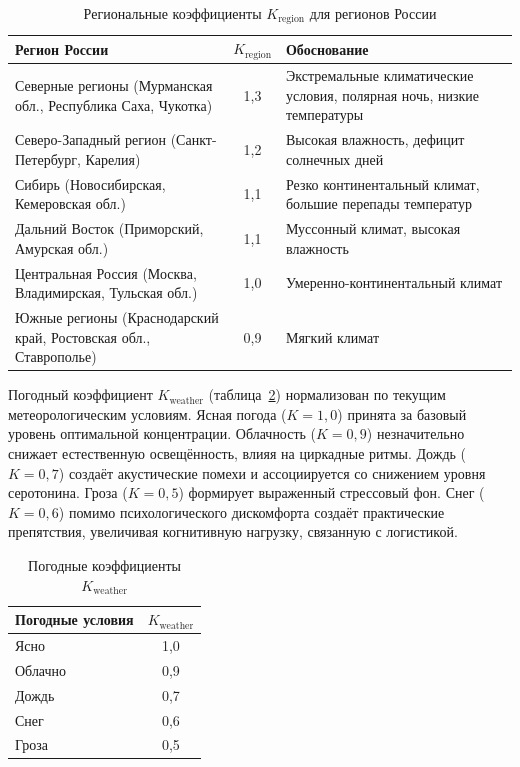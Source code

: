 \begin{table}[htbp]
\centering
\caption{Региональные коэффициенты $K_{\text{region}}$ для регионов России}
\label{tab:region}
\begin{tabular}{|p{6cm}|c|p{6cm}|}
\hline
\textbf{Регион России} & \textbf{$K_{\text{region}}$} & \textbf{Обоснование} \\
\hline
Северные регионы (Мурманская обл., Республика Саха, Чукотка) & 1{,}3 & Экстремальные климатические условия, полярная ночь, низкие температуры \\
\hline
Северо-Западный регион (Санкт-Петербург, Карелия) & 1{,}2 & Высокая влажность, дефицит солнечных дней\\
\hline
Сибирь (Новосибирская, Кемеровская обл.) & 1{,}1 & Резко континентальный климат, большие перепады температур\\
\hline
Дальний Восток (Приморский, Амурская обл.) & 1{,}1 & Муссонный климат, высокая влажность\\
\hline
Центральная Россия (Москва, Владимирская, Тульская обл.) & 1{,}0 & Умеренно-континентальный климат\\
\hline
Южные регионы (Краснодарский край, Ростовская обл., Ставрополье) & 0{,}9 & Мягкий климат\\
\hline
\end{tabular}
\end{table}

Погодный коэффициент $K_{\text{weather}}$ (таблица~\ref{tab:weather}) нормализован 
по текущим метеорологическим условиям. Ясная погода ($K = 1{,}0$) принята за базовый 
уровень оптимальной концентрации. Облачность ($K = 0{,}9$) незначительно снижает 
естественную освещённость, влияя на циркадные ритмы. Дождь ($K = 0{,}7$) создаёт 
акустические помехи и ассоциируется со снижением уровня серотонина. Гроза ($K = 0{,}5$) 
формирует выраженный стрессовый фон. Снег ($K = 0{,}6$) помимо психологического дискомфорта 
создаёт практические препятствия, увеличивая когнитивную нагрузку, связанную с логистикой.

\begin{table}[htbp]
\centering
\caption{Погодные коэффициенты $K_{\text{weather}}$}
\label{tab:weather}
\begin{tabular}{|p{8cm}|c|}
\hline
\textbf{Погодные условия} & \textbf{$K_{\text{weather}}$} \\
\hline
Ясно & 1{,}0 \\
\hline
Облачно & 0{,}9 \\
\hline
Дождь & 0{,}7 \\
\hline
Снег & 0{,}6 \\
\hline
Гроза & 0{,}5 \\
\hline
\end{tabular}
\end{table}


